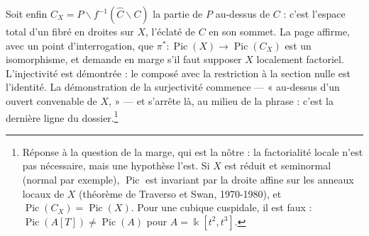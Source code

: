 \documentclass[11pt,a4paper]{article}
\begin{document}
Soit enfin $C_X = P \smallsetminus f^{-1}(\widehat{C} \smallsetminus C)$ la
partie de $P$ au-dessus de $C$ : c'est l'espace total d'un fibré en droites sur
$X$, l'éclaté de $C$ en son sommet. La page affirme, avec un point
d'interrogation, que $\pi^*\colon \operatorname{Pic}(X) \to
\operatorname{Pic}(C_X)$ est un isomorphisme, et demande en marge s'il faut
supposer $X$ localement factoriel. L'injectivité est démontrée : le composé
avec la restriction à la section nulle est l'identité. La démonstration de la
surjectivité commence --- « au-dessus d'un ouvert convenable de $X$, » --- et
s'arrête là, au milieu de la phrase : c'est la dernière ligne du
dossier.\footnote{Réponse à la question de la marge, qui est la nôtre : la
factorialité locale n'est pas nécessaire, mais une hypothèse l'est. Si $X$ est
réduit et seminormal (normal par exemple), $\operatorname{Pic}$ est
invariant par la droite affine sur les anneaux locaux de $X$ (théorème de
Traverso et Swan, 1970-1980), et $\operatorname{Pic}(C_X) = \operatorname{Pic}(X)$.
Pour une cubique cuspidale, il est faux : $\operatorname{Pic}(A[T]) \neq
\operatorname{Pic}(A)$ pour $A = \Bbbk[t^2, t^3]$.}
\end{document}
